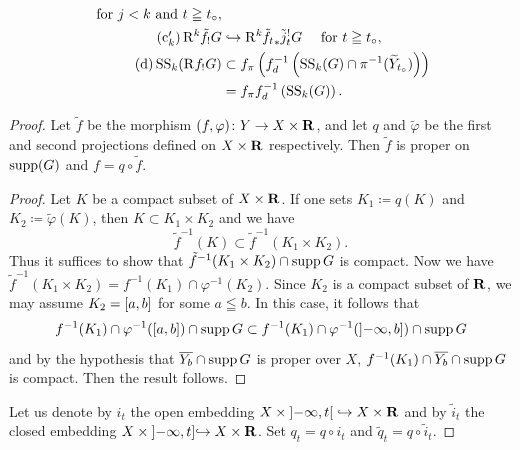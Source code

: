 \begin{Proposition+}
\begin{enumerate}[(i)]
\begin{align}
      \quad
      \text{ for \(j<k\) and \(t\geqq t_\circ\)},\\
      \tag{c\(_k'\)}
      \Rder[k]{\tilde{f}_{!}}G
      &\hookrightarrow
      \Rder[k]\tilde{f_{t}}_{\ast}\tilde{j}^{!}_{t}G
      \quad
      \text{ for \(t\geqq t_\circ\)},\\
      \tag{d}
      \muS[k](\Rder[]{f_{!}}G)
      &\subset
      \mpb[f]\left(\mdiff[f]^{-1}\left(
        \muS[k](G)\cap \pi^{-1}(\widetilde{Y}_{t_{\circ}})
      \right)\right)\\
      \notag&=\mpb[f]\mdiff[f]^{-1}\left(
        \muS[k](G)
      \right).
    \end{align}
  \end{enumerate}
\end{Proposition+}

\begin{proof}
  Let \(\tilde{f}\) be the morphism \(
    (f,\varphi)\colon Y\to X\times \rr
  \), and let \(q\) and \(\tilde{\varphi}\) be 
  the first and second projections 
  defined on \(X\times \rr\) respectively. 
  Then \(\tilde{f}\) is proper on \(\supp(G)\) and 
  \(f=q\circ \tilde{f}\). 
  \begin{proof}
    Let \(K\) be a compact subset of \(X\times \rr\). 
    If one sets \(K_{1}\coloneqq q(K)\) and \(K_{2}\coloneqq \tilde{\varphi}(K)\), 
    then \(K\subset K_{1}\times K_{2}\) and 
    we have \[
        \tilde{f}^{-1}(K)
        \subset 
        \tilde{f}^{-1}(K_{1}\times K_{2}).
    \]
    Thus it suffices to show that \(
        \tilde{f}^{-1}(K_{1}\times K_{2})\cap \supp{G}
    \) is compact. 
    Now we have \(
        \tilde{f}^{-1}(K_{1}\times K_{2})
        =
        f^{-1}(K_{1})\cap \varphi^{-1}(K_{2})
    \). Since \(K_{2}\) is a compact subset of \(\rr\), 
    we may assume \(K_{2}=\closedintvl{a,b}\) 
    for some \(a\leqq b\). 
    In this case, it follows that
    \[
        f^{-1}(K_1)\cap \varphi^{-1}(\closedintvl{a,b})\cap \supp{G}
        \subset
        f^{-1}(K_1)\cap \varphi^{-1}(\lopenrclosedintvl{-\infty,b})\cap \supp{G}
    \]
    and by the hypothesis that \(\overline{Y_{b}}\cap \supp{G}\) is proper over \(X\), 
    \(f^{-1}(K_{1})\cap \overline{Y_{b}}\cap \supp{G}\) is compact. 
    Then the result follows. 
  \end{proof}
  Let us denote by \(i_t\) the open embedding \(
    X\times\lopen -\infty, t\ropen\hookrightarrow X\times \rr
  \) and by \(\tilde{i}_t\) the closed embedding \(
    X\times\lopen -\infty, t\rclosed\hookrightarrow X\times \rr
  \). Set \(q_t=q\circ i_t\) and \(\tilde{q}_t=q\circ\tilde{i}_t\). 

\end{proof}
